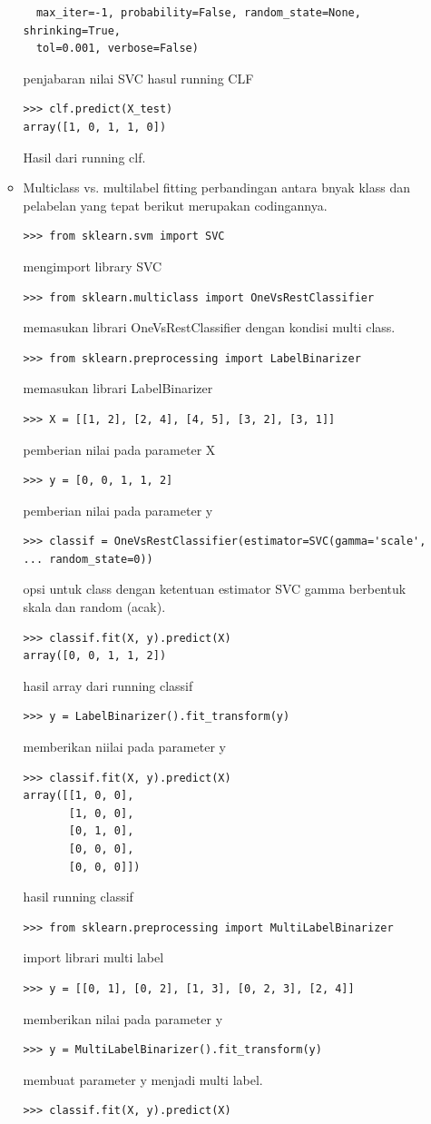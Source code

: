 \begin{enumerate}
\begin{itemize}
\begin{verbatim}
  max_iter=-1, probability=False, random_state=None, shrinking=True,
  tol=0.001, verbose=False)
\end{verbatim}
penjabaran nilai SVC hasul running CLF
\begin{verbatim}
>>> clf.predict(X_test)
array([1, 0, 1, 1, 0])
\end{verbatim}
Hasil dari  running clf.
\item
Multiclass vs. multilabel fitting
perbandingan antara bnyak klass dan pelabelan yang tepat berikut merupakan codingannya.
\begin{verbatim}
>>> from sklearn.svm import SVC
\end{verbatim}
mengimport library SVC
\begin{verbatim}
>>> from sklearn.multiclass import OneVsRestClassifier
\end{verbatim}
memasukan librari OneVsRestClassifier dengan kondisi multi class.
\begin{verbatim} 
>>> from sklearn.preprocessing import LabelBinarizer
\end{verbatim}
memasukan librari  LabelBinarizer
\begin{verbatim}
>>> X = [[1, 2], [2, 4], [4, 5], [3, 2], [3, 1]]
\end{verbatim}
pemberian nilai pada parameter X
\begin{verbatim}
>>> y = [0, 0, 1, 1, 2]
\end{verbatim}
pemberian nilai pada parameter y
\begin{verbatim}
>>> classif = OneVsRestClassifier(estimator=SVC(gamma='scale',
... random_state=0))
\end{verbatim}
opsi untuk class dengan ketentuan estimator SVC gamma berbentuk skala dan random (acak).
\begin{verbatim}
>>> classif.fit(X, y).predict(X)
array([0, 0, 1, 1, 2])
\end{verbatim}
hasil array dari running classif
\begin{verbatim}
>>> y = LabelBinarizer().fit_transform(y)
\end{verbatim}
memberikan niilai pada parameter y
\begin{verbatim}
>>> classif.fit(X, y).predict(X)
array([[1, 0, 0],
       [1, 0, 0],
       [0, 1, 0],
       [0, 0, 0],
       [0, 0, 0]])
\end{verbatim}
hasil running classif 
\begin{verbatim}
>>> from sklearn.preprocessing import MultiLabelBinarizer
\end{verbatim}
import librari multi label
\begin{verbatim}
>>> y = [[0, 1], [0, 2], [1, 3], [0, 2, 3], [2, 4]]
\end{verbatim}
memberikan nilai pada parameter y
\begin{verbatim}
>>> y = MultiLabelBinarizer().fit_transform(y)
\end{verbatim}
membuat parameter y menjadi multi label.
\begin{verbatim}
>>> classif.fit(X, y).predict(X)
\end{verbatim}
\end{itemize}
\end{enumerate}


